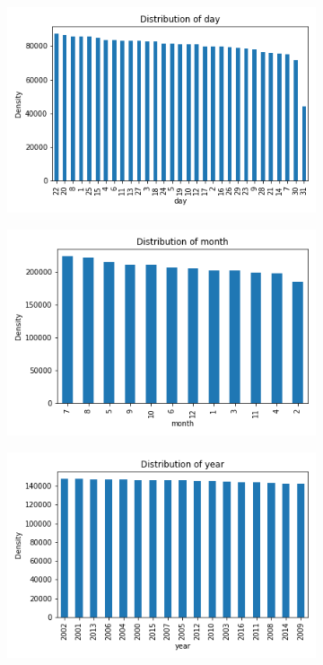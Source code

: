 \documentclass{article}
\begin{document}
\begin{itemize}
           \begin{figure}[htbp]
            \centering
            \begin{subfigure}{0.3\textwidth}
                \centering
                \includegraphics[width=\linewidth]{pic/hist/Distribution day.png}
            \end{subfigure}
            \begin{subfigure}{0.3\textwidth}
                \centering
                \includegraphics[width=\linewidth]{pic/hist/Distribution month.png}
            \end{subfigure}
            \begin{subfigure}{0.3\textwidth}
                \centering
                \includegraphics[width=\linewidth]{pic/hist/Distribution year.png}

\end{subfigure}
\end{figure}
\end{itemize}
\end{document}

